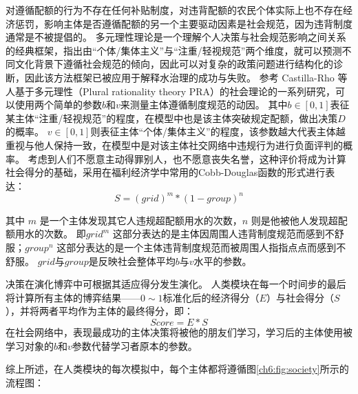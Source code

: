 对遵循配额的行为不存在任何补贴制度，对违背配额的农民个体实际上也不存在经济惩罚，影响主体是否遵循配额的另一个主要驱动因素是社会规范，因为违背制度通常是不被提倡的。
多元理性理论是一个理解个人决策与社会规范影响之间关系的经典框架，指出由“个体/集体主义”与“注重/轻视规范”两个维度，就可以预测不同文化背景下遵循社会规范的倾向\cite{verweij2015}，因此可以对复杂的政策问题进行结构化的诊断，因此该方法框架已被应用于解释水治理的成功与失败。
参考 Castilla-Rho 等人基于多元理性（Plural rationality theory PRA）的社会理论的一系列研究，可以使用两个简单的参数$b$和$v$来测量主体遵循制度规范的动因\cite{castilla-rho2015, castilla-rho2017, castilla-rho2020}。
其中$b\in[0, 1]$表征某主体“注重/轻视规范”的程度，在模型中也是该主体突破规定配额，做出决策$D$的概率。
$v \in [0, 1]$则表征主体“个体/集体主义”的程度，该参数越大代表主体越重视与他人保持一致，在模型中是对该主体社交网络中违规行为进行负面评判的概率。
考虑到人们不愿意主动得罪别人，也不愿意丧失名誉，这种评价将成为计算社会得分的基础，采用在福利经济学中常用的Cobb-Douglas函数的形式进行表达：
\begin{equation}
    S = {(grid)}^m * {(1 - group)}^n
    \label{ch6:eq:society}
\end{equation}

其中 $m$ 是一个主体发现其它人违规超配额用水的次数，$n$ 则是他被他人发现超配额用水的次数。
即$grid^m$ 这部分表达的是主体因周围人违背制度规范而感到不舒服；$group^n$ 这部分表达的是一个主体违背制度规范而被周围人指指点点而感到不舒服。
$grid$与$group$是反映社会整体平均$b$与$v$水平的参数。

决策在演化博弈中可根据其适应得分发生演化。
人类模块在每一个时间步的最后将计算所有主体的博弈结果——$0 \sim 1$标准化后的经济得分（$E$）与社会得分（$S$），并将两者平均作为主体的最终得分，即：
\begin{equation}
    \label{ch6:eq:score}
    Score = E * S
\end{equation}
在社会网络中，表现最成功的主体决策将被他的朋友们学习，学习后的主体使用被学习对象的$b$和$v$参数代替学习者原本的参数。

综上所述，在人类模块的每次模拟中，每个主体都将遵循图\ref{ch6:fig:society}所示的流程图：

